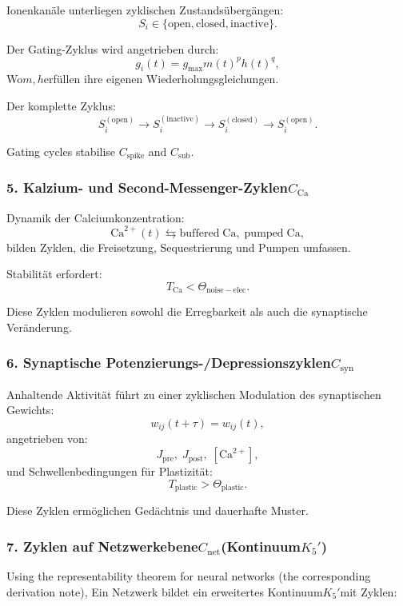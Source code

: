 Ionenkanäle unterliegen zyklischen Zustandsübergängen:
\[
  S_i \in \{\mathrm{open}, \mathrm{closed}, \mathrm{inactive}\}.
\]

Der Gating-Zyklus wird angetrieben durch:
\[
  g_i(t) = g_{\mathrm{max}} m(t)^p h(t)^q,
\]
Wo$m,h$erfüllen ihre eigenen Wiederholungsgleichungen.

Der komplette Zyklus:
\[
  S_i^{(\mathrm{open})}
  \to
  S_i^{(\mathrm{inactive})}
  \to
  S_i^{(\mathrm{closed})}
  \to
  S_i^{(\mathrm{open})}.
\]

Gating cycles stabilise $C_{\mathrm{spike}}$ and $C_{\mathrm{sub}}$.

\subsubsection{5. Kalzium- und Second-Messenger-Zyklen$C_{\mathrm{Ca}}$}

Dynamik der Calciumkonzentration:
\[
  \mathrm{Ca}^{2+}(t)
  \leftrightarrows
  \mathrm{buffered\; Ca},\;
  \mathrm{pumped\; Ca},
\]
bilden Zyklen, die Freisetzung, Sequestrierung und Pumpen umfassen.

Stabilität erfordert:
\[
  T_{\mathrm{Ca}} < \Theta_{\mathrm{noise-elec}}.
\]

Diese Zyklen modulieren sowohl die Erregbarkeit als auch die synaptische Veränderung.

\subsubsection{6. Synaptische Potenzierungs-/Depressionszyklen$C_{\mathrm{syn}}$}

Anhaltende Aktivität führt zu einer zyklischen Modulation des synaptischen Gewichts:
\[
  w_{ij}(t+\tau) = w_{ij}(t),
\]
angetrieben von:
\[
  J_{\mathrm{pre}},\; J_{\mathrm{post}},\; [\mathrm{Ca}^{2+}],
\]
und Schwellenbedingungen für Plastizität:
\[
  T_{\mathrm{plastic}} > \Theta_{\mathrm{plastic}}.
\]

Diese Zyklen ermöglichen Gedächtnis und dauerhafte Muster.

\subsubsection{7. Zyklen auf Netzwerkebene$C_{\mathrm{net}}$(Kontinuum$K_5'$)}

Using the representability theorem for neural networks (the corresponding derivation note),
Ein Netzwerk bildet ein erweitertes Kontinuum$K_5'$mit Zyklen:


